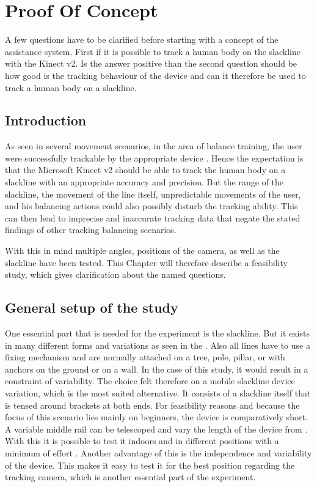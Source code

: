 \section{Proof Of Concept}\label{3_3_proofOfConcept}

A few questions have to be clarified before starting with a concept of the assistance system. First if it is possible to track a human body on the slackline with the Kinect v2. Is the answer positive than the second question should be how good is the tracking behaviour of the device and can it therefore be used to track a human body on a slackline.

\subsection{Introduction}
As seen in several movement scenarios, in the area of balance training, the user were successfully trackable by the appropriate device \textbf{\todo{[CITE]}}. Hence the expectation is that the Microsoft Kinect v2 should be able to track the human body on a slackline with an appropriate accuracy and precision. But the range of the slackline, the movement of the line itself, unpredictable movements of the user, and his balancing actions could also possibly disturb the tracking ability. This can then lead to imprecise and inaccurate tracking data that negate the stated findings of other tracking balancing scenarios.

With this in mind multiple angles, positions of the camera, as well as the slackline have been tested. This Chapter will therefore describe a feasibility study, which gives clarification about the named questions. 

\subsection{General setup of the study} %
One essential part that is needed for the experiment is the slackline. But it exists in many different forms and variations as seen in the \textbf{}. Also all lines have to use a fixing mechanism and are normally attached on a tree, pole, pillar, or with anchors on the ground or on a wall. In the case of this study, it would result in a constraint of variability. 
The choice felt therefore on a mobile slackline device variation, which is the most suited alternative. It consists of a slackline itself that is tensed around brackets at both ends. For feasibility reasons and because the focus of this scenario lies mainly on beginners, the device is comparatively short. A variable middle rail can be telescoped and vary the length of the device from \textbf{}. With this it is possible to test it indoors and in different positions with a minimum of effort \textbf{ }. Another advantage of this is the independence and variability of the device. This makes it easy to test it for the best position regarding the tracking camera, which is another essential part of the experiment.

